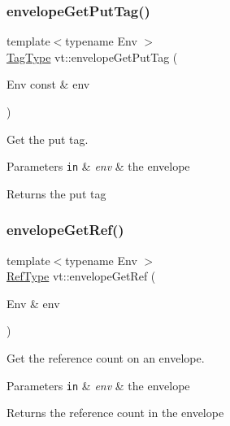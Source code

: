 \subsubsection{\texorpdfstring{envelope\+Get\+Put\+Tag()}{envelopeGetPutTag()}}
{\footnotesize\ttfamily template$<$typename Env $>$ \\
\hyperlink{namespacevt_a84ab281dae04a52a4b243d6bf62d0e52}{Tag\+Type} vt\+::envelope\+Get\+Put\+Tag (\begin{DoxyParamCaption}\item[{Env const \&}]{env }\end{DoxyParamCaption})\hspace{0.3cm}{\ttfamily [inline]}}



Get the put tag. 


\begin{DoxyParams}[1]{Parameters}
\mbox{\tt in}  & {\em env} & the envelope\\
\hline
\end{DoxyParams}
\begin{DoxyReturn}{Returns}
the put tag 
\end{DoxyReturn}
\mbox{\label{namespacevt_ad664e6e94c1ea309344adad1c3fb291c}} 
\subsubsection{\texorpdfstring{envelope\+Get\+Ref()}{envelopeGetRef()}}
{\footnotesize\ttfamily template$<$typename Env $>$ \\
\hyperlink{namespacevt_a60fda95dc2316580f0ccf87d570f1d9e}{Ref\+Type} vt\+::envelope\+Get\+Ref (\begin{DoxyParamCaption}\item[{Env \&}]{env }\end{DoxyParamCaption})\hspace{0.3cm}{\ttfamily [inline]}}



Get the reference count on an envelope. 


\begin{DoxyParams}[1]{Parameters}
\mbox{\tt in}  & {\em env} & the envelope\\
\hline
\end{DoxyParams}
\begin{DoxyReturn}{Returns}
the reference count in the envelope 
\end{DoxyReturn}
\mbox{\label{namespacevt_af16ad10e40d8a2f2c1128068774c1bc4}} 
